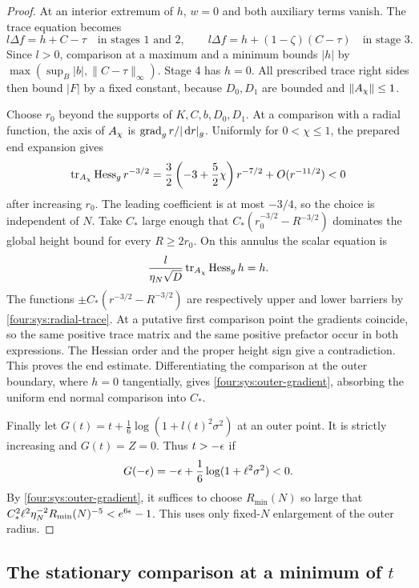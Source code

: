 \begin{proof}
At an interior extremum of $h$, $w=0$ and both auxiliary terms vanish.
The trace equation becomes
\[
 l\Delta f=h+C-\tau\quad\text{in stages 1 and 2},\qquad
 l\Delta f=h+(1-\zeta)(C-\tau)\quad\text{in stage 3}.
\]
Since $l>0$, comparison at a maximum and a minimum bounds $|h|$ by
$\max(\sup_B|b|,\|C-\tau\|_\infty)$.  Stage 4 has $h=0$.
All prescribed trace right sides then bound $|F|$ by a fixed constant,
because $D_0,D_1$ are bounded and $\|A_\chi\|\le1$.

Choose $r_0$ beyond the supports of $K,C,b,D_0,D_1$.  At a comparison
with a radial function, the axis of $A_\chi$ is
$\operatorname{grad}_g r/|\,\mathrm d r|_g$.  Uniformly for $0<\chi\le1$, the prepared end
expansion gives
\begin{equation}\label{four:sys:radial-trace}
 \operatorname{tr}_{A_\chi}\operatorname{Hess}_g r^{-3/2}
 =\frac32\left(-3+\frac52\chi\right)r^{-7/2}
                +O(r^{-11/2})<0
\end{equation}
after increasing $r_0$.  The leading coefficient is at most $-3/4$,
so the choice is independent of $N$.  Take $C_*$ large enough that
$C_*(r_0^{-3/2}-R^{-3/2})$ dominates the global height bound for every
$R\ge2r_0$.  On this annulus the scalar equation is
\[
 \frac{l}{\eta_N\sqrt D}\operatorname{tr}_{A_\chi}\operatorname{Hess}_g h=h.
\]
The functions $\pm C_*(r^{-3/2}-R^{-3/2})$ are respectively upper and
lower barriers by \eqref{four:sys:radial-trace}.  At a putative first
comparison point the gradients coincide, so the same positive trace
matrix and the same positive prefactor occur in both expressions.
The Hessian order and the proper height sign give a contradiction.
This proves the end estimate.  Differentiating the comparison at the
outer boundary, where $h=0$ tangentially, gives
\eqref{four:sys:outer-gradient}, absorbing the uniform end normal comparison
into $C_*$.

Finally let $G(t)=t+\frac16\log(1+l(t)^2\sigma^2)$ at an outer point.
It is strictly increasing and $G(t)=Z=0$.  Thus $t>-\epsilon$ if
\[
 G(-\epsilon)=-\epsilon+\frac16\log(1+\ell^2\sigma^2)<0.
\]
By \eqref{four:sys:outer-gradient}, it suffices to choose
$R_{\min}(N)$ so large that
$C_*^2\ell^2\eta_N^{-2}R_{\min}(N)^{-5}<e^{6\epsilon}-1$.
This uses only fixed-$N$ enlargement of the outer radius.
\end{proof}

\subsection{The stationary comparison at a minimum of \texorpdfstring{$t$}{t}}


